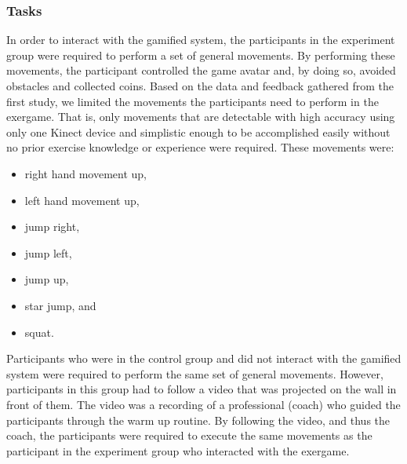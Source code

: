 \subsubsection{Tasks}
In order to interact with the gamified system, the participants in the experiment group were required to perform a set of general movements. By performing these movements, the participant controlled the game avatar and, by doing so, avoided obstacles and collected coins. Based on the data and feedback gathered from the first study, we limited the movements the participants need to perform in the exergame. That is, only movements that are detectable with high accuracy using only one Kinect device and simplistic enough to be accomplished easily without no prior exercise knowledge or experience were required. These movements were: 
\begin{itemize}
\item right hand movement up,
\item left hand movement up,
\item jump right,
\item jump left,
\item jump up, 
\item star jump, and
\item squat.
\end{itemize}
Participants who were in the control group and did not interact with the gamified system were required to perform the same set of general movements. However, participants in this group had to follow a video that was projected on the wall in front of them. The video was a recording of a professional (coach) who guided the participants through the warm up routine. By following the video, and thus the coach, the participants were required to execute the same movements as the participant in the experiment group who interacted with the exergame.

